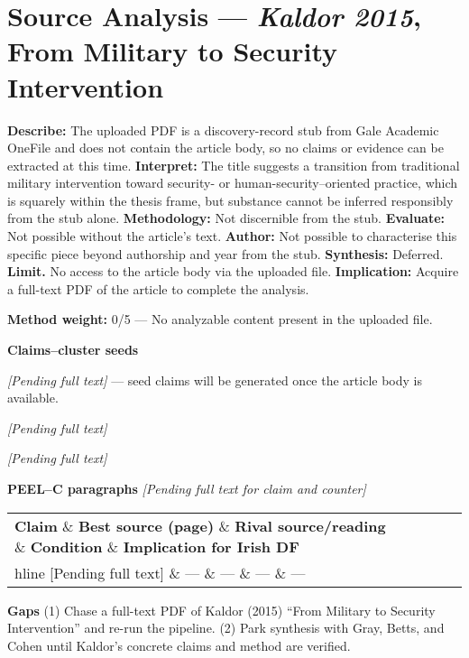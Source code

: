 \parencite{KALDOR_2015}

\section*{Source Analysis — \textit{Kaldor 2015}, From Military to Security Intervention}
\textbf{Describe:} The uploaded PDF is a discovery-record stub from Gale Academic OneFile and does not contain the article body, so no claims or evidence can be extracted at this time.
\textbf{Interpret:} The title suggests a transition from traditional military intervention toward security- or human-security–oriented practice, which is squarely within the thesis frame, but substance cannot be inferred responsibly from the stub alone.
\textbf{Methodology:} Not discernible from the stub.
\textbf{Evaluate:} Not possible without the article’s text.
\textbf{Author:} Not possible to characterise this specific piece beyond authorship and year from the stub.
\textbf{Synthesis:} Deferred.
\textbf{Limit.} No access to the article body via the uploaded file.
\textbf{Implication:} Acquire a full-text PDF of the article to complete the analysis.

\textbf{Method weight:} 0/5 — No analyzable content present in the uploaded file.

\textbf{Claims–cluster seeds}

\textit{[Pending full text]} — seed claims will be generated once the article body is available.

\textit{[Pending full text]}

\textit{[Pending full text]}

\textbf{PEEL–C paragraphs}
\textit{[Pending full text for claim and counter]}

 
\begin{tabular}{p{3.2cm}p{4.2cm}p{3.6cm}p{3.2cm}p{4.2cm}}
	\textbf{Claim} \& \textbf{Best source (page)} \& \textbf{Rival source/reading} \& \textbf{Condition} \& \textbf{Implication for Irish DF}\\hline
	[Pending full text] \& — \& — \& — \& —\
\end{tabular}

\textbf{Gaps}
(1) Chase a full-text PDF of Kaldor (2015) “From Military to Security Intervention” and re-run the pipeline.
(2) Park synthesis with Gray, Betts, and Cohen until Kaldor’s concrete claims and method are verified.


\parencite{KALDOR_2010}


